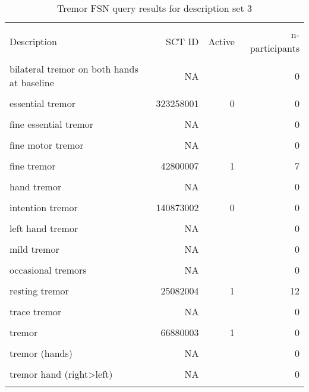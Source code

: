 \documentclass[10pt, letterpaper]{article}
\begin{document}
\begin{spacing}{1.0}
\begin{footnotesize}
    \begin{longtable}[H]{p{4in}rrr}
        \caption{Tremor FSN query results for description set 3}\\[-4pt]
        \hline\\[-6pt]
        Description & SCT ID & Active & n-participants\\[2pt]
        \hline\\[-4pt]
        \endhead
        bilateral tremor on both hands at baseline & NA &  & 0\\
        & & &\\[-6pt]
        essential tremor & 323258001 & 0 & 0\\
        & & &\\[-6pt]
        fine essential tremor & NA &  & 0\\
        & & &\\[-6pt]
        fine motor tremor & NA &  & 0\\
        & & &\\[-6pt]
        fine tremor & 42800007 & 1 & 7\\
        & & &\\[-6pt]
        hand tremor & NA &  & 0\\
        & & &\\[-6pt]
        intention tremor & 140873002 & 0 & 0\\
        & & &\\[-6pt]
        left hand tremor & NA &  & 0\\
        & & &\\[-6pt]
        mild tremor & NA &  & 0\\
        & & &\\[-6pt]
        occasional tremors & NA &  & 0\\
        & & &\\[-6pt]
        resting tremor & 25082004 & 1 & 12\\
        & & &\\[-6pt]
        trace tremor & NA &  & 0\\
        & & &\\[-6pt]
        tremor & 66880003 & 1 & 0\\
        & & &\\[-6pt]
        tremor (hands) & NA &  & 0\\
        & & &\\[-6pt]
        tremor hand (right>left) & NA &  & 0\\
        & & &\\[-6pt]

\end{longtable}
\end{footnotesize}
\end{spacing}
\end{document}
